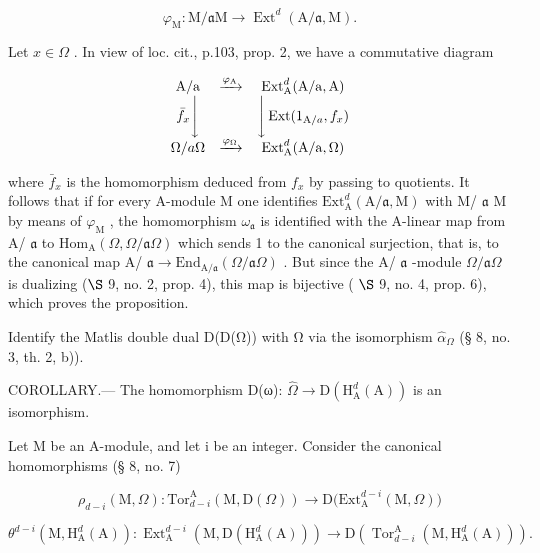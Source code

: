 \[
\varphi_ {\mathrm{M}}: \mathrm{M} / \mathfrak {a} \mathrm{M} \longrightarrow \operatorname{Ext} ^ {d} (\mathrm{A} / \mathfrak {a}, \mathrm{M}).
\]

Let \(x \in \Omega\) . In view of loc. cit., p.103, prop. 2, we have a commutative diagram

\[
\begin{array}{c c c} \mathrm{A/a} & \xrightarrow {\varphi_ {\mathrm{A}}} & \operatorname{Ext} _ {\mathrm{A}} ^ {d} (\mathrm{A/a}, \mathrm{A}) \\ \bar {f} _ {x} \Bigg \downarrow & & \Bigg \downarrow \operatorname{Ext} (1 _ {\mathrm{A} / a}, f _ {x}) \\ \Omega / a \Omega & \xrightarrow {\varphi_ {\Omega}} & \operatorname{Ext} _ {\mathrm{A}} ^ {d} (\mathrm{A/a}, \Omega) \end{array}
\]

where \(\bar{f}_x\) is the homomorphism deduced from \(f_x\) by passing to quotients. It follows that if for every A-module M one identifies \(\mathrm{Ext}_{\mathrm{A}}^{d}(\mathrm{A}/\mathfrak{a},\mathrm{M})\) with M/ \(\mathfrak{a}\) M by means of \(\varphi_{\mathrm{M}}\) , the homomorphism \(\omega_{\mathfrak{a}}\) is identified with the A-linear map from A/ \(\mathfrak{a}\) to \(\mathrm{Hom}_{\mathrm{A}}(\Omega,\Omega/\mathfrak{a}\Omega)\) which sends 1 to the canonical surjection, that is, to the canonical map A/ \(\mathfrak{a}\longrightarrow\mathrm{End}_{\mathrm{A}/\mathfrak{a}}(\Omega/\mathfrak{a}\Omega)\) . But since the A/ \(\mathfrak{a}\) -module \(\Omega/\mathfrak{a}\Omega\) is dualizing (\(\S\) 9, no. 2, prop. 4), this map is bijective ( \(\S\) 9, no. 4, prop. 6), which proves the proposition.

Identify the Matlis double dual D(D(Ω)) with Ω via the isomorphism \(\widehat{\alpha}_{\Omega}\) (§ 8, no. 3, th. 2, b)).

COROLLARY.--- The homomorphism D(ω): \(\widehat{\Omega} \rightarrow \mathrm{D}(\mathrm{H}_{\mathrm{A}}^{d}(\mathrm{A}))\) is an isomorphism.

Let M be an A-module, and let i be an integer. Consider the canonical homomorphisms (§ 8, no. 7)

\[
\rho_ {d - i} (\mathrm{M}, \Omega): \mathrm{Tor} _ {d - i} ^ {\mathrm{A}} (\mathrm{M}, \mathrm{D} (\Omega)) \longrightarrow \mathrm{D} \big (\mathrm{Ext} _ {\mathrm{A}} ^ {d - i} (\mathrm{M}, \Omega) \big)
\]

\[
\theta^ {d - i} (\mathrm{M}, \mathrm{H} _ {\mathrm{A}} ^ {d} (\mathrm{A})): \operatorname{Ext} _ {\mathrm{A}} ^ {d - i} \left(\mathrm{M}, \mathrm{D} \left(\mathrm{H} _ {\mathrm{A}} ^ {d} (\mathrm{A})\right)\right) \longrightarrow \mathrm{D} \left(\operatorname{Tor} _ {d - i} ^ {\mathrm{A}} \left(\mathrm{M}, \mathrm{H} _ {\mathrm{A}} ^ {d} (\mathrm{A})\right)\right).
\]

